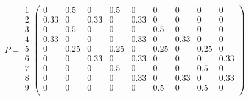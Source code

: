 \documentclass{templateNote}
\begin{document}
\begin{enumerate}
    \begin{center}
        \[
        P = 
        \begin{array}{l}
        \text{1} \\
        \text{2} \\
        \text{3} \\
        \text{4} \\
        \text{5} \\
        \text{6} \\
        \text{7} \\
        \text{8} \\
        \text{9} \\
        \end{array}
        \left(
        \begin{array}{ccccccccc}
            0 & 0.5 & 0 & 0.5 & 0 & 0 & 0 & 0 & 0\\
            0.33 & 0 & 0.33 & 0 & 0.33 & 0 & 0 & 0 & 0\\
            0 & 0.5 & 0 & 0 & 0 & 0.5 & 0 & 0 & 0\\
            0.33 & 0 & 0 & 0 & 0.33 & 0 & 0.33 & 0 & 0\\
            0 & 0.25 & 0 & 0.25 & 0 & 0.25 & 0 & 0.25 & 0\\
            0 & 0 & 0.33 & 0 & 0.33 & 0 & 0 & 0 & 0.33\\
            0 & 0 & 0 & 0.5 & 0 & 0 & 0 & 0.5 & 0\\
            0 & 0 & 0 & 0 & 0.33 & 0 & 0.33 & 0 & 0.33\\
            0 & 0 & 0 & 0 & 0 & 0.5 & 0 & 0.5 & 0\\
        \end{array}
        \right)
        \]
    \end{center}


\end{enumerate}
\end{document}
